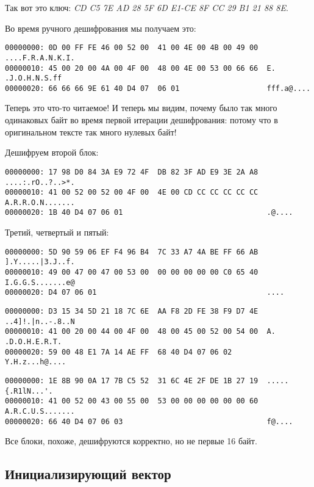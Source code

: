 Так вот это ключ: \emph{CD C5 7E AD 28 5F 6D E1-CE 8F CC 29 B1 21 88 8E}.

Во время ручного дешифрования мы получаем это:

\begin{lstlisting}
00000000: 0D 00 FF FE 46 00 52 00  41 00 4E 00 4B 00 49 00  ....F.R.A.N.K.I.
00000010: 45 00 20 00 4A 00 4F 00  48 00 4E 00 53 00 66 66  E. .J.O.H.N.S.ff
00000020: 66 66 66 9E 61 40 D4 07  06 01                    fff.a@....
\end{lstlisting}

Теперь это что-то читаемое!
И теперь мы видим, почему было так много одинаковых байт во время первой итерации дешифрования:
потому что в оригинальном тексте так много нулевых байт!

Дешифруем второй блок:

\begin{lstlisting}
00000000: 17 98 D0 84 3A E9 72 4F  DB 82 3F AD E9 3E 2A A8  ....:.rO..?..>*.
00000010: 41 00 52 00 52 00 4F 00  4E 00 CD CC CC CC CC CC  A.R.R.O.N.......
00000020: 1B 40 D4 07 06 01                                 .@....
\end{lstlisting}

Третий, четвертый и пятый:

\begin{lstlisting}
00000000: 5D 90 59 06 EF F4 96 B4  7C 33 A7 4A BE FF 66 AB  ].Y.....|3.J..f.
00000010: 49 00 47 00 47 00 53 00  00 00 00 00 00 C0 65 40  I.G.G.S.......e@
00000020: D4 07 06 01                                       ....
\end{lstlisting}

\begin{lstlisting}
00000000: D3 15 34 5D 21 18 7C 6E  AA F8 2D FE 38 F9 D7 4E  ..4]!.|n..-.8..N
00000010: 41 00 20 00 44 00 4F 00  48 00 45 00 52 00 54 00  A. .D.O.H.E.R.T.
00000020: 59 00 48 E1 7A 14 AE FF  68 40 D4 07 06 02        Y.H.z...h@....
\end{lstlisting}

\begin{lstlisting}
00000000: 1E 8B 90 0A 17 7B C5 52  31 6C 4E 2F DE 1B 27 19  .....{.R1lN...'.
00000010: 41 00 52 00 43 00 55 00  53 00 00 00 00 00 00 60  A.R.C.U.S.......
00000020: 66 40 D4 07 06 03                                 f@....
\end{lstlisting}

Все блоки, похоже, дешифруются корректно, но не первые 16 байт.

\subsection{Инициализирующий вектор}

